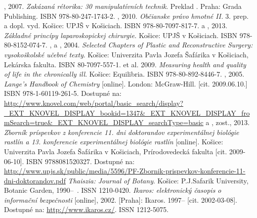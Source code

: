 \documentclass[thesismargins, english, thesislinespacing, twoside, openright, upjsfrontpage]{rnthesis}
\begin{document}
\begin{thebibliography}{9}
%
  , 2007. \emph{Zakázaná rétorika: 30 manipulatívních technik}. Preklad
. Praha: Grada Publishing. ISBN 978-80-247-1743-2.
  , 2010. \emph{Občianske právo hmotné II.} 3. prep. a dopl. vyd. Košice: UPJŠ v Košiciach. ISBN 978-80-7097-817-7.
   a , 2013. \emph{Základné princípy laparoskopickej chirurgie.} Košice: UPJŠ v Košiciach. ISBN 978-80-8152-074-7.
  ,  a , 2004. \emph{Selected Chapters of Plastic and Reconstructive Surgery: vysokoškolské učebné texty}. Košice: Univerzita Pavla Jozefa Šafárika v Košiciach, Lekárska fakulta. ISBN 80-7097-557-1.
   et al. 2009. \emph{Measuring health and quality of life in the chronically ill}. Košice: Equilibria. ISBN 978-80-892-8446-7.
  , 2005. \emph{Lange's Handbook of Chemistry} [online]. London: McGraw-Hill. [cit. 2009.06.10.] ISBN 978-1-60119-261-5. Dostupné na: \url{http://www.knovel.com/web/portal/basic_search/display?_EXT_KNOVEL_DISPLAY_bookid=1347&_EXT_KNOVEL_DISPLAY_fromSearch=true&_EXT_KNOVEL_DISPLAY_searchType=basic}
   a , zost., 2013. \emph{Zborník príspevkov z konferencie 11. dni doktorandov experimentálnej biológie rastlín a 13. konferencie experimentálnej biológie rastlín} [online]. Košice: Univerzita Pavla Jozefa Šafárika v Košiciach, Prírodovedecká fakulta [cit. 2009-06-10]. ISBN 9788081520327. Dostupné na: \url{
http://www.upjs.sk/public/media/5596/PF-Zbornik-prispevkov-konferencie-11-dni-doktorandov.pdf}
%
  \emph{Thaiszia: Journal of Botany}. Košice: P.J.Safarik University, Botanic Garden, \mbox{1990--\ .} ISSN 1210-0420.
  \emph{Ikaros: elektronický časopis o informační bezpečnosti} [online], 2002. [Praha]: Ikaros. 1997--{} [cit. 2002-03-08]. Dostupné na: \url{http://www.ikaros.cz/}. ISSN 1212-5075.

\end{thebibliography}
\end{document}
